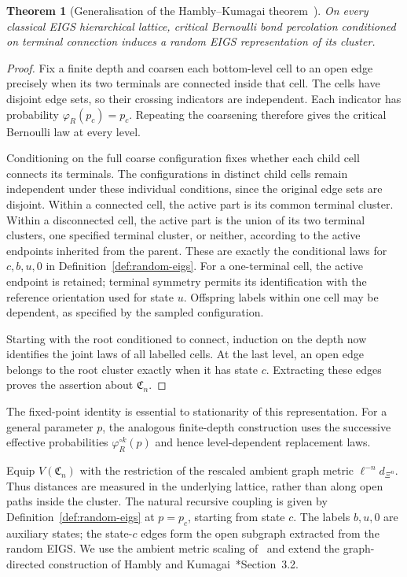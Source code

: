 \documentclass[scheme=plain,11pt]{ctexart}
\newtheorem{theorem}{Theorem}[section]
\theoremstyle{definition}
\theoremstyle{remark}
\begin{document}
\begin{theorem}[Generalisation of the Hambly--Kumagai theorem~\cite{hambly2010diffusion}]\label{thm:percolation-random-eigs}
On every classical EIGS hierarchical lattice, critical Bernoulli bond percolation conditioned on terminal connection induces a random EIGS representation of its cluster.
\end{theorem}
\begin{proof}
Fix a finite depth and coarsen each bottom-level cell to an open edge precisely when its two terminals are connected inside that cell.
The cells have disjoint edge sets, so their crossing indicators are independent.
Each indicator has probability $\varphi_R(p_c)=p_c$.
Repeating the coarsening therefore gives the critical Bernoulli law at every level.

Conditioning on the full coarse configuration fixes whether each child cell connects its terminals.
The configurations in distinct child cells remain independent under these individual conditions, since the original edge sets are disjoint.
Within a connected cell, the active part is its common terminal cluster.
Within a disconnected cell, the active part is the union of its two terminal clusters, one specified terminal cluster, or neither, according to the active endpoints inherited from the parent.
These are exactly the conditional laws for $c,b,u,0$ in Definition~\ref{def:random-eigs}.
For a one-terminal cell, the active endpoint is retained; terminal symmetry permits its identification with the reference orientation used for state $u$.
Offspring labels within one cell may be dependent, as specified by the sampled configuration.

Starting with the root conditioned to connect, induction on the depth now identifies the joint laws of all labelled cells.
At the last level, an open edge belongs to the root cluster exactly when it has state $c$.
Extracting these edges proves the assertion about $\mathfrak C_n$.
\end{proof}

The fixed-point identity is essential to stationarity of this representation.
For a general parameter $p$, the analogous finite-depth construction uses the successive effective probabilities $\varphi_R^{\circ k}(p)$ and hence level-dependent replacement laws.

Equip $V(\mathfrak C_n)$ with the restriction of the rescaled ambient graph metric $\ell^{-n}d_{\Xi^n}$.
Thus distances are measured in the underlying lattice, rather than along open paths inside the cluster.
The natural recursive coupling is given by Definition~\ref{def:random-eigs} at $p=p_c$, starting from state $c$.
The labels $b,u,0$ are auxiliary states; the state-$c$ edges form the open subgraph extracted from the random EIGS.
We use the ambient metric scaling of~\cite{neroli2024fractal} and extend the graph-directed construction of Hambly and Kumagai~\cite{hambly2010diffusion}*{Section~3.2}.
\end{document}

